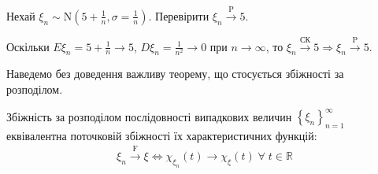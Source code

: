 \begin{example}
    Нехай $\xi_n \sim \mathrm{N}\left(5 + \frac{1}{n}, \sigma = \frac{1}{n}\right)$. Перевірити $\xi_n \overset{\mathrm{P}}{\longrightarrow} 5$.
    
    \noindent Оскільки $E\xi_n = 5+\frac{1}{n} \to 5$, $D\xi_n = \frac{1}{n^2} \to 0$ при $n \to \infty$,
    то $\xi_n \overset{\text{СК}}{\longrightarrow} 5 \Rightarrow \xi_n \overset{\mathrm{P}}{\longrightarrow} 5$.
\end{example}

Наведемо без доведення важливу теорему, що стосується збіжності за розподілом.

\begin{theorem*}
    Збіжність за розподілом послідовності випадкових величин $\left\{ \xi_n\right\}_{n=1}^{\infty}$ еквівалентна поточковій збіжності їх
    характеристичних функцій:
    \begin{gather}\label{levi_theor}
        \xi_n \overset{\mathrm{F}}{\longrightarrow} \xi \Longleftrightarrow \chi_{\xi_n}(t) \to \chi_\xi (t) \; \forall \; t\in \mathbb{R}
    \end{gather}
\end{theorem*}